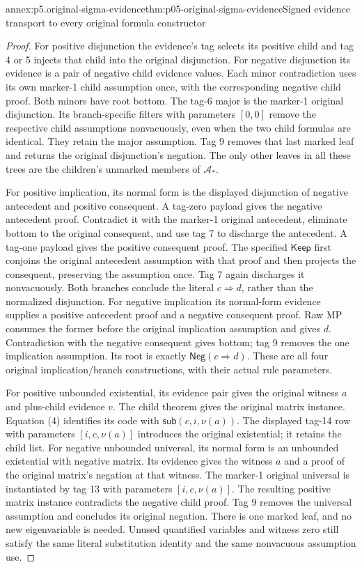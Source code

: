 \begin{annexitem}{annex:p5.original-sigma-evidence}{thm:p05-original-sigma-evidence}{Signed evidence transport to every original formula constructor}
\begin{proof}
For positive disjunction the evidence's tag selects its positive
child and tag 4 or 5 injects that child into the original
disjunction. For negative disjunction its evidence is a pair
of negative child evidence values. Each minor contradiction uses
its own marker-1 child assumption once, with the corresponding
negative child proof. Both minors have root bottom. The tag-6
major is the marker-1 original disjunction. Its branch-specific
filters with parameters \([0,0]\) remove the respective child
assumptions nonvacuously, even when the two child formulas are
identical. They retain the major assumption. Tag 9 removes that
last marked leaf and returns the original disjunction's negation.
The only other leaves in all these trees are the children's
unmarked members of \(\mathcal A_*\).

For positive implication, its normal form is the displayed
disjunction of negative antecedent and positive consequent.
A tag-zero payload gives the negative antecedent proof. Contradict
it with the marker-1 original antecedent, eliminate bottom to the
original consequent, and use tag 7 to discharge the antecedent.
A tag-one payload gives the positive consequent proof. The
specified \(\mathsf{Keep}\) first conjoins the original
antecedent assumption with that proof and then projects the
consequent, preserving the assumption once. Tag 7 again discharges
it nonvacuously. Both branches conclude the literal
\(c\Rightarrow d\), rather than the normalized disjunction.
For negative implication its normal-form evidence supplies a
positive antecedent proof and a negative consequent proof.
Raw MP consumes the former before the original implication
assumption and gives \(d\). Contradiction with the negative
consequent gives bottom; tag 9 removes the one implication
assumption. Its root is exactly
\(\mathsf{Neg}(c\Rightarrow d)\). These are all four original
implication/branch constructions, with their actual rule parameters.

For positive unbounded existential, its evidence pair gives the
original witness \(a\) and plus-child evidence \(v\).
The child theorem gives the original matrix instance. Equation
(4) identifies its code with \(\mathsf{sub}(c,i,\nu(a))\).
The displayed tag-14 row with parameters \([i,c,\nu(a)]\)
introduces the original existential; it retains the child list.
For negative unbounded universal, its normal form is an
unbounded existential with negative matrix. Its evidence gives
the witness \(a\) and a proof of the original matrix's
negation at that witness. The marker-1 original universal is
instantiated by tag 13 with parameters \([i,c,\nu(a)]\).
The resulting positive matrix instance contradicts the negative
child proof. Tag 9 removes the universal assumption and concludes
its original negation. There is one marked leaf, and no new
eigenvariable is needed. Unused quantified variables and witness
zero still satisfy the same literal substitution identity and
the same nonvacuous assumption use.


\end{proof}
\end{annexitem}
